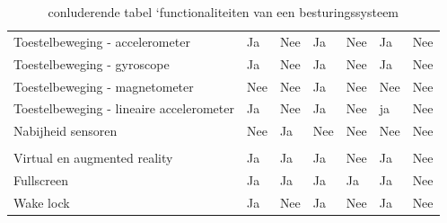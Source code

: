 \begin{table}[]
\begin{tabular}{p{6cm}p{13mm}p{13mm}p{13mm}p{13mm}p{13mm}p{13mm}}
				   Toestelbeweging - accelerometer & \cellcolor{green!40} Ja  & \cellcolor{red!50} Nee & \cellcolor{green!40} Ja  & \cellcolor{red!50} Nee& \cellcolor{green!40} Ja & \cellcolor{red!50} Nee \\
				   
				   Toestelbeweging - gyroscope & \cellcolor{green!40} Ja  & \cellcolor{red!50} Nee & \cellcolor{green!40} Ja  & \cellcolor{red!50} Nee& \cellcolor{green!40} Ja & \cellcolor{red!50} Nee \\
				   
				    Toestelbeweging - magnetometer & \cellcolor{red!50} Nee  & \cellcolor{red!50} Nee & \cellcolor{green!40} Ja  & \cellcolor{red!50} Nee& \cellcolor{red!50} Nee & \cellcolor{red!50} Nee \\
				   
				   Toestelbeweging - lineaire accelerometer  & \cellcolor{green!40} Ja  & \cellcolor{red!50} Nee & \cellcolor{green!40} Ja  & \cellcolor{red!50} Nee& \cellcolor{green!40} ja  & \cellcolor{red!50} Nee \\
				   
				   Nabijheid sensoren &  \cellcolor{red!50} Nee  &  \cellcolor{green!40} Ja  &  \cellcolor{red!50} Nee  & \cellcolor{red!50} Nee &  \cellcolor{red!50} Nee &  \cellcolor{red!50} Nee \\
				   
				   &  & &  &  &  &  \\
				   
				    Virtual en augmented reality  & \cellcolor{green!40} Ja  & \cellcolor{green!40} Ja & \cellcolor{green!40} Ja & \cellcolor{red!50} Nee  & \cellcolor{green!40} Ja & \cellcolor{red!50} Nee \\
				    
				     Fullscreen & \cellcolor{green!40} Ja  & \cellcolor{green!40} Ja & \cellcolor{green!40} Ja & \cellcolor{green!40} Ja   & \cellcolor{green!40} Ja & \cellcolor{red!50} Nee \\
				   
				   Wake lock & \cellcolor{green!40} Ja  &  \cellcolor{red!50} Nee & \cellcolor{green!40} Ja  & \cellcolor{red!50} Nee & \cellcolor{green!40} Ja &  \cellcolor{red!50} Nee \\
	
			\end{tabular}	

			\caption{conluderende tabel ‘functionaliteiten van een besturingssysteem}
		\end{table}
	
